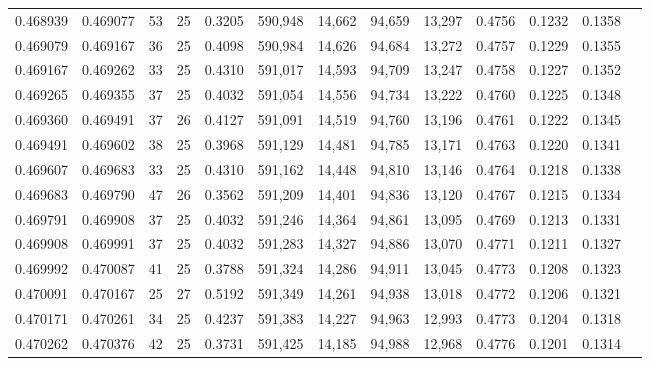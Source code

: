 \begin{tabular}{rrrrrrrrrrrrr}
0.468939 & 0.469077 &    53 &  25 &                                     0.3205 & 590,948 &  14,662 &  94,659 &  13,297 & 0.4756 & 0.1232 & 0.1358 \\
0.469079 & 0.469167 &    36 &  25 &                                     0.4098 & 590,984 &  14,626 &  94,684 &  13,272 & 0.4757 & 0.1229 & 0.1355 \\
0.469167 & 0.469262 &    33 &  25 &                                     0.4310 & 591,017 &  14,593 &  94,709 &  13,247 & 0.4758 & 0.1227 & 0.1352 \\
0.469265 & 0.469355 &    37 &  25 &                                     0.4032 & 591,054 &  14,556 &  94,734 &  13,222 & 0.4760 & 0.1225 & 0.1348 \\
0.469360 & 0.469491 &    37 &  26 &                                     0.4127 & 591,091 &  14,519 &  94,760 &  13,196 & 0.4761 & 0.1222 & 0.1345 \\
0.469491 & 0.469602 &    38 &  25 &                                     0.3968 & 591,129 &  14,481 &  94,785 &  13,171 & 0.4763 & 0.1220 & 0.1341 \\
0.469607 & 0.469683 &    33 &  25 &                                     0.4310 & 591,162 &  14,448 &  94,810 &  13,146 & 0.4764 & 0.1218 & 0.1338 \\
0.469683 & 0.469790 &    47 &  26 &                                     0.3562 & 591,209 &  14,401 &  94,836 &  13,120 & 0.4767 & 0.1215 & 0.1334 \\
0.469791 & 0.469908 &    37 &  25 &                                     0.4032 & 591,246 &  14,364 &  94,861 &  13,095 & 0.4769 & 0.1213 & 0.1331 \\
0.469908 & 0.469991 &    37 &  25 &                                     0.4032 & 591,283 &  14,327 &  94,886 &  13,070 & 0.4771 & 0.1211 & 0.1327 \\
0.469992 & 0.470087 &    41 &  25 &                                     0.3788 & 591,324 &  14,286 &  94,911 &  13,045 & 0.4773 & 0.1208 & 0.1323 \\
0.470091 & 0.470167 &    25 &  27 &                                     0.5192 & 591,349 &  14,261 &  94,938 &  13,018 & 0.4772 & 0.1206 & 0.1321 \\
0.470171 & 0.470261 &    34 &  25 &                                     0.4237 & 591,383 &  14,227 &  94,963 &  12,993 & 0.4773 & 0.1204 & 0.1318 \\
0.470262 & 0.470376 &    42 &  25 &                                     0.3731 & 591,425 &  14,185 &  94,988 &  12,968 & 0.4776 & 0.1201 & 0.1314 \\

\end{tabular}
